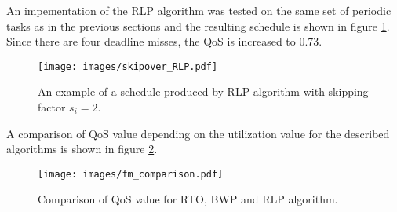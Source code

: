 An impementation of the RLP algorithm was tested on the same set of periodic tasks as in the previous sections and the resulting schedule is shown in figure 
\ref{rlp_schedule}.
Since there are four deadline misses, the QoS is increased to 0.73.

\begin{figure}[ht]
    \centering
    \texttt{[image: images/skipover\_RLP.pdf]}
    \caption{An example of a schedule produced by RLP algorithm with skipping factor $s_i=2$.}
    \label{rlp_schedule}
\end{figure}

A comparison of QoS value depending on the utilization value for the described algorithms is shown in figure \ref{fm_comparison}.

\begin{figure}[ht]
    \centering
    \texttt{[image: images/fm\_comparison.pdf]}
    \caption{Comparison of QoS value for RTO, BWP and RLP algorithm.}
    \label{fm_comparison}
\end{figure}






